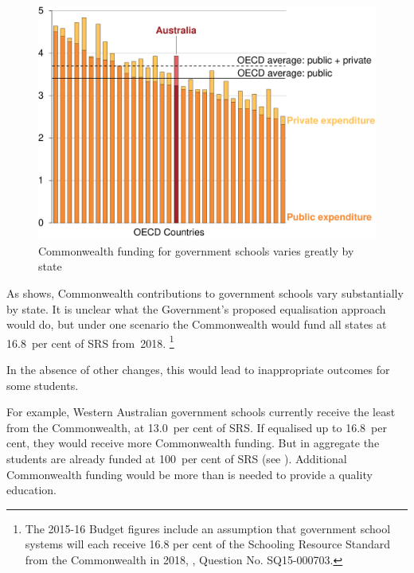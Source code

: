\documentclass{grattan}
\begin{document}
\begin{figure}
\caption{Commonwealth funding for government schools varies greatly by state}\label{fig:funding-is-highly-variable-by-sector-and-state}


\includegraphics[page=12]{atlas/Charts.pdf}
\end{figure}

As  shows, Commonwealth contributions to government schools vary substantially by state. It is unclear what the \mbox{Government's} proposed equalisation approach would do, but under one scenario the Commonwealth would fund all states at 16.8~per cent of SRS from~2018.%
\footnote{The 2015-16 Budget figures include an assumption that government school systems will each receive 16.8 per cent of the Schooling Resource Standard from the Commonwealth in 2018, \textcite{SenateSQ15000703}, Question No. SQ15-000703.}

In the absence of other changes, this would lead to inappropriate outcomes for some students.

For example, Western Australian government schools currently receive the least from the Commonwealth, at 13.0~per cent of SRS\@. If equalised up to 16.8~per cent, they would receive more Commonwealth funding. But in aggregate the students are already funded at 100~per cent of SRS (see ). Additional Commonwealth funding would be more than is needed to provide a quality education.
\end{document}
